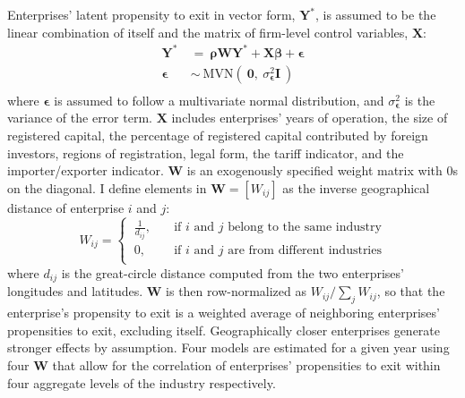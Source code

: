 Enterprises' latent propensity to exit in vector form, $\bm{Y^*}$, is assumed to be the linear combination of itself and the matrix of firm-level control variables, $\bm{X}$:
\begin{equation}
  \nonumber
  \begin{aligned}
    \bm{Y^*} \  & = \  \bm{ \rho W Y^* } + \bm{ X \beta } + \bm{ \epsilon } \\
    \bm{ \epsilon } \ & \sim \  \text{MVN} \left( \ \bm{0}, \  \sigma_{\bm{\epsilon}}^2 \bm{I} \  \right) \\
  \end{aligned}
\end{equation}
where $\bm{\epsilon}$ is assumed to follow a multivariate normal distribution, and $\sigma_{\bm{\epsilon}}^2$ is the variance of the error term. $\bm{X}$ includes enterprises' years of operation, the size of registered capital, the percentage of registered capital contributed by foreign investors, regions of registration, legal form, the tariff indicator, and the importer/exporter indicator. $\bm{W}$ is an exogenously specified weight matrix with $0$s on the diagonal. I define elements in $\bm{W}=\left[W_{ij}\right]$ as the inverse geographical distance of enterprise $i$ and $j$:
\begin{equation}
  \nonumber
  W_{ij} = \left \{ \
  \begin{aligned}
    \frac{1}{d_{ij}}, & \quad \text{if $i$ and $j$ belong to the same industry} \\
    0, & \quad \text{if $i$ and $j$ are from different industries} \\
  \end{aligned} \right.
\end{equation}
where $d_{ij}$ is the great-circle distance computed from the two enterprises' longitudes and latitudes. $\bm{W}$ is then row-normalized as $W_{ij}/\sum_j W_{ij}$, so that the enterprise's propensity to exit is a weighted average of neighboring enterprises' propensities to exit, excluding itself. Geographically closer enterprises generate stronger effects by assumption. Four models are estimated for a given year using four $\bm{W}$ that allow for the correlation of enterprises' propensities to exit within four aggregate levels of the industry respectively.

